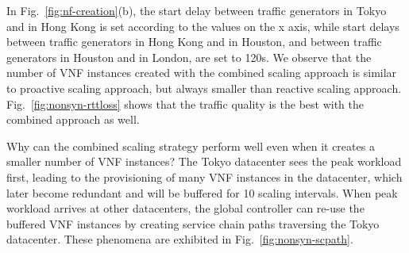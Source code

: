In Fig.~\ref{fig:nf-creation}(b), the start delay between traffic generators in Tokyo and in Hong Kong is set according to the values on the x axis, while start delays between traffic generators in Hong Kong and in Houston, and between traffic generators in Houston and in London, are set to 120s. We observe that the number of VNF instances created with the combined scaling approach is similar to proactive scaling approach, but always smaller than reactive scaling approach. Fig.~\ref{fig:nonsyn-rttloss} shows that the traffic quality is the best with the combined approach as well. %


Why can the combined scaling strategy perform well even when it creates a smaller number of VNF instances? The Tokyo datacenter sees the peak workload first, leading to the provisioning of many VNF instances in the datacenter, which later become redundant and will be buffered for 10 scaling intervals. When peak workload arrives at other datacenters, the global controller can re-use the buffered VNF instances by creating service chain paths traversing the Tokyo datacenter. %
 These phenomena are exhibited in Fig.~\ref{fig:nonsyn-scpath}. %

